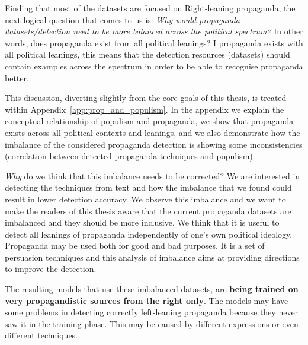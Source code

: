 Finding that most of the datasets are focused on Right-leaning propaganda, the next logical question that comes to us is: \emph{Why would propaganda datasets/detection need to be more balanced across the political spectrum?} In other words, does propaganda exist from all political leanings?
I propaganda exists with all political leanings, this means that the detection resources (datasets) should contain examples across the spectrum in order to be able to recognise propaganda better.

This discussion, diverting slightly from the core goals of this thesis, is treated within Appendix~\ref{app:prop_and_populism}.
In the appendix we explain the conceptual relationship of populism and propaganda, we show that propaganda exists across all political contexts and leanings, and we also demonstrate how the imbalance of the considered propaganda detection is showing some inconsistencies (correlation between detected propaganda techniques and populism).






\emph{Why} do we think that this imbalance needs to be corrected?
We are interested in detecting the techniques from text and how the imbalance that we found could result in lower detection accuracy.
We observe this imbalance and we want to make the readers of this thesis aware that the current propaganda datasets are imbalanced and they should be more inclusive.
We think that it is useful to detect all leanings of propaganda independently of one's own political ideology. %
Propaganda may be used both for good and bad purposes. It is a set of persuasion techniques and this analysis of imbalance aims at providing directions to improve the detection.




The resulting models that use these imbalanced datasets, are \textbf{being trained on very propagandistic sources from the right only}. The models may have some problems in detecting correctly left-leaning propaganda because they never saw it in the training phase. This may be caused by different expressions or even different techniques.

